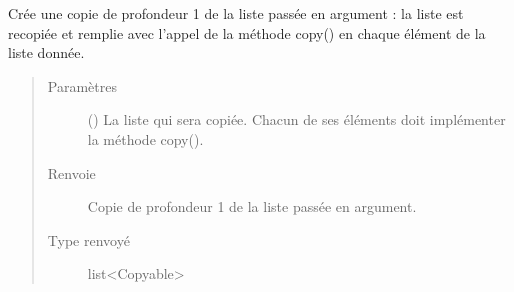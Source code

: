 \documentclass[letterpaper,10pt,french]{sphinxmanual}
\begin{document}
\begin{fulllineitems}
\label{\detokenize{index:DecisionTheoreticTroubleshooting.shallow_copy_list_of_copyable}}
Crée une copie de profondeur 1 de la liste passée en argument : la liste
est recopiée et remplie avec l’appel de la méthode copy() en chaque élément
de la liste donnée.
\begin{quote}\begin{description}
\item[{Paramètres}] \leavevmode
{} () \textendash{} La liste qui sera copiée. Chacun de ses éléments doit implémenter la
méthode copy().

\item[{Renvoie}] \leavevmode
{} \textendash{} Copie de profondeur 1 de la liste passée en argument.

\item[{Type renvoyé}] \leavevmode
list\textless{}Copyable\textgreater{}

\end{description}\end{quote}

\end{fulllineitems}

\end{document}
